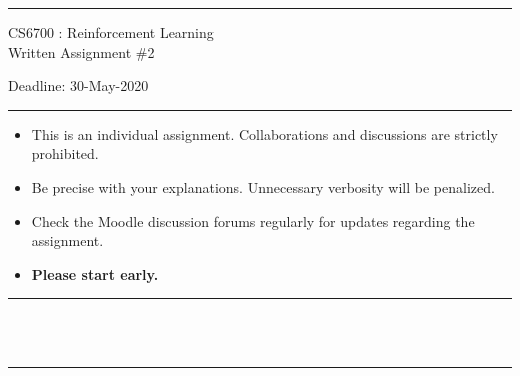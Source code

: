 \documentclass[solution,addpoints,12pt]{exam}
\begin{document}
\hrule
\vspace{1mm}
\noindent 
\begin{center}
{\Large CS6700 : Reinforcement Learning} \\
{\large Written Assignment \#2}
\end{center}
\vspace{1mm}
\noindent 
{Deadline: 30-May-2020}

\vspace{2mm}
\hrule

{\small

\begin{itemize}\itemsep0mm
\item This is an individual assignment. Collaborations and discussions are strictly
prohibited.
\item Be precise with your explanations. Unnecessary verbosity will be penalized.
\item Check the Moodle discussion forums regularly for updates regarding the assignment.
\item \textbf{Please start early.}

\end{itemize}
}

\hrule

\vspace{3mm}
 \\[1mm]
 \\
\hrule
\end{document}
